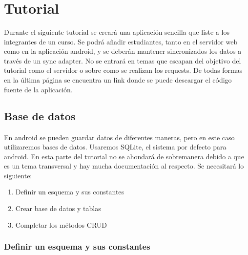 \documentclass[10pt]{extarticle}
\begin{document}
\section{Tutorial}

\paragraph{}
Durante el siguiente tutorial se creará una aplicación sencilla que liste a los integrantes de un curso. Se podrá añadir estudiantes, tanto en el servidor web como en la aplicación android, y se deberán mantener sincronizados los datos a través de un sync adapter. No se entrará en temas que escapan del objetivo del tutorial como el servidor o sobre como se realizan los requests. De todas formas en la última página se encuentra un link donde se puede descargar el código fuente de la aplicación.

\subsection{Base de datos}

\paragraph{}
En android se pueden guardar datos de diferentes maneras, pero en este caso utilizaremos bases de datos. Usaremos SQLite, el sistema por defecto para android. En esta parte del tutorial no se ahondará de sobremanera debido a que es un tema transversal y hay mucha documentación al respecto. Se necesitará lo siguiente:

\begin{enumerate}
 \item Definir un esquema y sus constantes
 \item Crear base de datos y tablas
 \item Completar los métodos CRUD
\end{enumerate}

\subsubsection{Definir un esquema y sus constantes}
\end{document}

